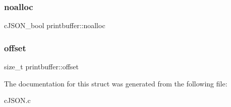 \subsubsection{\texorpdfstring{noalloc}{noalloc}}
{\footnotesize\ttfamily c\+J\+S\+O\+N\+\_\+bool printbuffer\+::noalloc}

\mbox{\label{structprintbuffer_a3ed6f9d24d6591047680492a962dc7c9}} 
\subsubsection{\texorpdfstring{offset}{offset}}
{\footnotesize\ttfamily size\+\_\+t printbuffer\+::offset}



The documentation for this struct was generated from the following file\+:\begin{DoxyCompactItemize}
\item 
c\+J\+S\+O\+N.\+c\end{DoxyCompactItemize}

